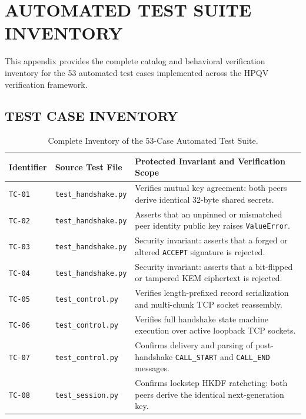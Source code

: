 \chapter{AUTOMATED TEST SUITE INVENTORY}
\label{app:tests}

This appendix provides the complete catalog and behavioral verification inventory for the 53 automated test cases implemented across the HPQV verification framework.

\section{TEST CASE INVENTORY}

\begin{table}[htbp]
    \centering
    \caption{Complete Inventory of the 53-Case Automated Test Suite.}
    \label{tab:full_test_inventory}
    \scriptsize
    \begin{tabularx}{\textwidth}{l l p{8.5cm}}
        \toprule
        \textbf{Identifier} & \textbf{Source Test File} & \textbf{Protected Invariant and Verification Scope} \\
        \midrule
        \texttt{TC-01} & \texttt{test\_handshake.py} & Verifies mutual key agreement: both peers derive identical 32-byte shared secrets. \\
        \texttt{TC-02} & \texttt{test\_handshake.py} & Asserts that an unpinned or mismatched peer identity public key raises \texttt{ValueError}. \\
        \texttt{TC-03} & \texttt{test\_handshake.py} & Security invariant: asserts that a forged or altered \texttt{ACCEPT} signature is rejected. \\
        \texttt{TC-04} & \texttt{test\_handshake.py} & Security invariant: asserts that a bit-flipped or tampered KEM ciphertext is rejected. \\
        \texttt{TC-05} & \texttt{test\_control.py} & Verifies length-prefixed record serialization and multi-chunk TCP socket reassembly. \\
        \texttt{TC-06} & \texttt{test\_control.py} & Verifies full handshake state machine execution over active loopback TCP sockets. \\
        \texttt{TC-07} & \texttt{test\_control.py} & Confirms delivery and parsing of post-handshake \texttt{CALL\_START} and \texttt{CALL\_END} messages. \\
        \texttt{TC-08} & \texttt{test\_session.py} & Confirms lockstep HKDF ratcheting: both peers derive the identical next-generation key. \\

\end{tabularx}
\end{table}
